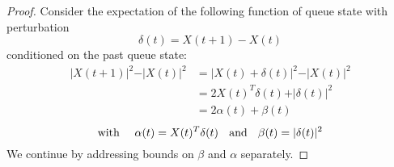 \begin{proof}
Consider the expectation of the following function of queue state with perturbation 
\begin{equation} \label{delta_def}
\delta(t) = X(t+1) - X(t)
\end{equation}  
conditioned on the past queue state:
\begin{align}
\vert X(t+1) \vert^2  - \vert X(t)\vert^2 &= \vert X(t) + \delta (t) \vert^2 - \vert X(t)\vert^2 \\
\nonumber &= 2X(t)^{T}\delta(t) + \vert \delta(t)  \vert^2 \\
\nonumber &= 2\alpha(t) + \beta(t) 
\end{align}
\begin{equation} \label{alpha_beta_defs}
\text{with \quad} \alpha(t)  = X(t)^{T}\delta(t)  \text{   \; and \;  }\beta(t) = \vert \delta (t) \vert^{2}
\end{equation}
We continue by addressing bounds on $\beta$ and $\alpha$ separately. 

\end{proof}
